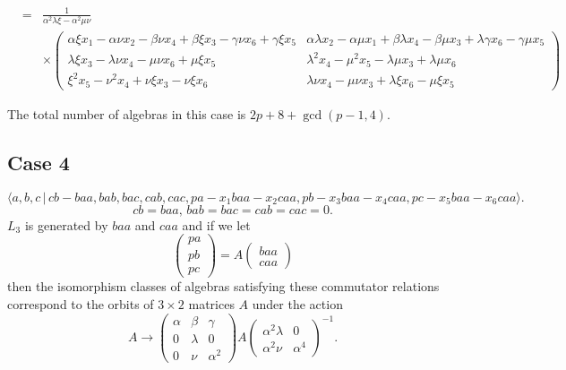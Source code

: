 \documentclass[10pt,thmsa]{article}
\begin{document}
\begin{eqnarray*}
&=&\frac{1}{\alpha ^{2}\lambda \xi -\alpha ^{2}\mu \nu } \\
&&\times \left( 
\begin{array}{cc}
\alpha \xi x_{1}-\alpha \nu x_{2}-\beta \nu x_{4}+\beta \xi x_{3}-\gamma \nu
x_{6}+\gamma \xi x_{5} & \alpha \lambda x_{2}-\alpha \mu x_{1}+\beta \lambda
x_{4}-\beta \mu x_{3}+\lambda \gamma x_{6}-\gamma \mu x_{5} \\ 
\lambda \xi x_{3}-\lambda \nu x_{4}-\mu \nu x_{6}+\mu \xi x_{5} & \lambda
^{2}x_{4}-\mu ^{2}x_{5}-\lambda \mu x_{3}+\lambda \mu x_{6} \\ 
\xi ^{2}x_{5}-\nu ^{2}x_{4}+\nu \xi x_{3}-\nu \xi x_{6} & \lambda \nu
x_{4}-\mu \nu x_{3}+\lambda \xi x_{6}-\mu \xi x_{5}%
\end{array}%
\right)
\end{eqnarray*}%
$\allowbreak $

The total number of algebras in this case is $2p+8+\gcd (p-1,4)$.

\subsection{Case 4}

\[
\langle
a,b,c\,|%
\,cb-baa,bab,bac,cab,cac,pa-x_{1}baa-x_{2}caa,pb-x_{3}baa-x_{4}caa,pc-x_{5}baa-x_{6}caa\rangle . 
\]%
\[
cb=baa,\,bab=bac=cab=cac=0. 
\]%
$L_{3}$ is generated by $baa$ and $caa$ and if we let 
\[
\left( 
\begin{array}{l}
pa \\ 
pb \\ 
pc%
\end{array}%
\right) =A\left( 
\begin{array}{l}
baa \\ 
caa%
\end{array}%
\right) 
\]%
then the isomorphism classes of algebras satisfying these commutator
relations correspond to the orbits of $3\times 2$ matrices $A$ under the
action 
\[
A\rightarrow \left( 
\begin{array}{lll}
\alpha & \beta & \gamma \\ 
0 & \lambda & 0 \\ 
0 & \nu & \alpha ^{2}%
\end{array}%
\right) A\left( 
\begin{array}{ll}
\alpha ^{2}\lambda & 0 \\ 
\alpha ^{2}\nu & \alpha ^{4}%
\end{array}%
\right) ^{-1}. 
\]
\end{document}
